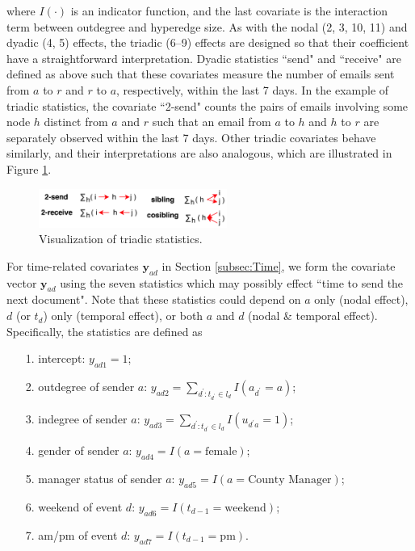 \documentclass[12pt]{article}
\begin{document}
	where $I(\cdot)$ is an indicator function, and the last covariate is the interaction term between outdegree and hyperedge size. As with the nodal (2, 3, 10, 11) and dyadic (4, 5) effects, the triadic (6--9) effects are designed so that their coefficient have a straightforward interpretation. Dyadic statistics ``send" and ``receive" are defined as above such that these covariates measure the number of emails sent from $a$ to $r$ and $r$ to $a$, respectively, within the last 7 days. In the example of triadic statistics, the covariate ``2-send" counts the pairs of emails involving some node $h$ distinct from $a$ and $r$ such that an email from $a$ to $h$ and $h$ to $r$ are separately observed within the last 7 days. Other triadic covariates behave similarly, and their interpretations are also analogous, which are illustrated in Figure \ref{figure:netstats}.
		\begin{figure}[!t]
			\centering
			\includegraphics[width=0.55\textwidth]{plots_paper/triad.png}	
			\caption {Visualization of triadic statistics.}
			\label{figure:netstats}
		\end{figure}

For time-related covariates $\boldsymbol{y}_{ad}$ in Section \ref{subsec:Time}, we form the covariate vector $\boldsymbol{y}_{ad}$ using the seven statistics which may possibly effect ``time to send the next document". Note that these statistics could depend on $a$ only (nodal effect), $d$ (or $t_d$) only (temporal effect), or both $a$ and $d$ (nodal \& temporal effect). Specifically, the statistics are defined as
\begin{itemize}
	\item[1.] intercept: ${y}_{ad1} =1$;
	\item[2.] outdegree of sender $a$: ${y}_{ad2} =\sum_{d^\prime: t_{d^\prime} \in l_d} I(a_{d^\prime} = a)$;
	\item[3.] indegree of sender $a$: ${y}_{ad3}=\sum_{d^\prime: t_{d^\prime} \in l_d} I(u_{d^\prime a} = 1)$;
	\item[4.] gender of sender $a$: ${y}_{ad4}=I(a= \mbox{female})$;
	\item[5.] manager status of sender $a$: ${y}_{ad5}=I(a= \mbox{County Manager})$;
	\item[6.] weekend of event $d$: ${y}_{ad6} = I(t_{d-1}= \mbox{weekend})$;
	\item[7.] am/pm of event $d$: ${y}_{ad7}= I(t_{d-1}= \mbox{pm})$.
\end{itemize}
\end{document}
